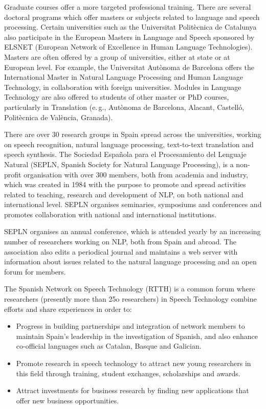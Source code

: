 \begin{multicols}{2}

Graduate courses offer a more targeted professional training. There are several doctoral programs which offer masters or subjects related to language and speech processing. Certain universities such as the Universitat Politècnica de Catalunya also participate in the European Masters in Language and Speech sponsored by ELSNET (European Network of Excellence in Human Language Technologies). Masters are often offered by a group of universities, either at state or at European level. For example, the Universitat Autònoma de Barcelona offers the International Master in Natural Language Processing and Human Language Technology, in collaboration with foreign universities. Modules in Language Technology are also offered to students of other master or PhD courses, particularly in Translation (e.\,g., Autònoma de Barcelona, Alacant, Castelló, Politècnica de València, Granada).

There are over 30 research groups in Spain spread across the universities, working on speech recognition, natural language processing, text-to-text translation and speech synthesis. The Sociedad Española para el Procesamiento del Lenguaje Natural (SEPLN, Spanish Society for Natural Language Processing), is a non-profit organisation with over 300 members, both from academia and industry, which was created in 1984 with the purpose to promote and spread activities related to teaching, research and development of NLP, on both national and international level. SEPLN organises seminaries, symposiums and conferences and promotes collaboration with national and international institutions.

SEPLN organises an annual conference, which is attended yearly by an increasing number of researchers working on NLP, both from Spain and abroad. The association also edits a periodical journal and maintains a web server with information about issues related to the natural language processing and an open forum for members.

The Spanish Network on Speech Technology (RTTH) \cite{GAL-Nota34} is a common forum where researchers (presently more than 25o researchers) in Speech Technology combine efforts and share experiences in order to:

\begin{itemize}
	\item Progress in building partnerships and integration of network members to maintain Spain's leadership in the investigation of Spanish, and also enhance co-official languages such as Catalan, Basque and Galician.
	\item Promote research in speech technology to attract new young researchers in this field through training, student exchanges, scholarships and awards.
	\item	 Attract investments for business research by finding new applications that offer new business opportunities. 
\end{itemize}


\end{multicols}
